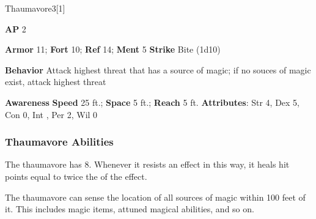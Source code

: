 \begin{monsection}{Thaumavore}{3}[1]
\vspace{-1em}\vspace{-1em}
\begin{spellcontent}
\begin{spelltargetinginfo}
{\textbf{AP} 2}

\pari \textbf{Armor} 11;
\textbf{Fort} 10;
\textbf{Ref} 14;
\textbf{Ment} 5
\pari \textbf{Strike} Bite  (1d10)



\pari \textbf{Behavior} Attack highest threat that has a source of magic; if no souces of magic exist, attack highest threat
\end{spelltargetinginfo}
\end{spellcontent}

\begin{monsterfooter}
\pari \textbf{Awareness} 
\pari \textbf{Speed} 25 ft.;
\textbf{Space} 5 ft.;
\textbf{Reach} 5 ft.
\pari \textbf{Attributes}:
Str 4,
Dex 5,
Con 0,
Int ,
Per 2,
Wil 0
\end{monsterfooter}
\end{monsection}


\subsubsection{Thaumavore Abilities}

The thaumavore has  8.
Whenever it resists an effect in this way, it heals hit points equal to twice the  of the effect.

\vspace{0.5em}
The thaumavore can sense the location of all sources of magic within 100 feet of it.
This includes magic items, attuned magical abilities, and so on.

